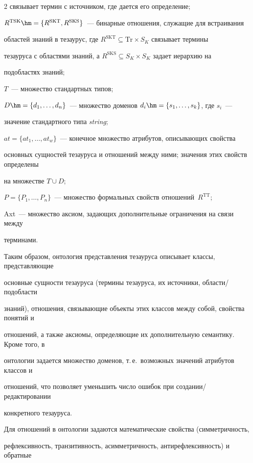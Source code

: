 \begin{multicols}{2}
связывает термин с источником, где дается его определение;

  $R^{\mathrm{TSK}}\hm=\{R^{\mathrm{SKT}},R^{\mathrm{SKS}}\}$~--- бинарные отношения, служащие для встраивания 

областей знаний в тезаурус, где $R^{\mathrm{SKT}}\subseteq \mathrm{Tr}\times S_K$ связывает термины 

тезауруса с областями знаний, а $R^{\mathrm{SKS}}\subseteq S_K\times S_K$ задает иерархию на 

подобластях знаний;

  $T$~--- множество стандартных типов;

  $D\hm=\{d_1,\ldots, d_n\}$~--- множество доменов $d_i\hm=\{s_1,\ldots, s_k\}$, где $s_i$~--- 

значение стандартного типа \textit{string}; 

  $at=\{at_1,\ldots, at_w\}$~--- конечное множество атрибутов, описывающих свойства 

основных сущностей тезауруса и отношений между ними; значения этих свойств определены 

на множестве $T\cup D$;

  $P=\{P_1,\ldots, P_n\}$~--- множество формальных свойств отношений~$R^{\mathrm{TT}}$;

  Axt~--- множество аксиом, задающих дополнительные ограничения на связи между 

терминами. 

  

  Таким образом, онтология представления тезауруса описывает классы, представляющие 

основные сущности тезауруса (термины тезауруса, их источники, области/подобласти 

знаний), отношения, связывающие объекты этих классов между собой, свойства понятий и 

отношений, а также аксиомы, определяющие их дополнительную семантику. Кроме того, в 

онтологии задается множество доменов, т.\,е.\ возможных значений атрибутов классов и 

отношений, что позволяет уменьшить число ошибок при создании/редактировании 

конкретного тезауруса.

  

  Для отношений в онтологии задаются математические свойства (симметричность, 

рефлексивность, транзитивность, асимметричность, антирефлексивность) и обратные 


\end{multicols}
